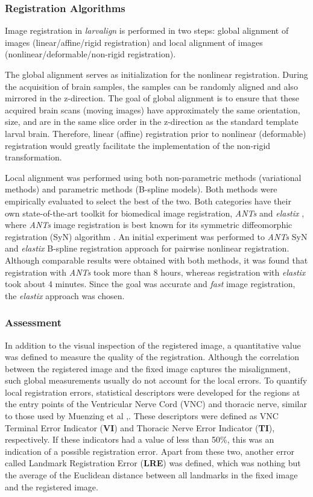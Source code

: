 \documentclass{report}
\begin{document}
	\subsubsection{Registration Algorithms}
	\label{subsubsection:registration_algo}
	Image registration in \emph{{larvalign}} is performed in two steps: global alignment of images (linear/affine/rigid registration) and local alignment of images (nonlinear/deformable/non-rigid registration).
	
	The global alignment serves as initialization for the nonlinear registration. During the acquisition of brain samples, the samples can be randomly aligned and also mirrored in the z-direction. The goal of global alignment is to ensure that these acquired brain scans (moving images) have approximately the same orientation, size, and are in the same slice order in the z-direction as the standard template larval brain.  Therefore, linear (affine) registration prior to nonlinear (deformable) registration would greatly facilitate the implementation of the non-rigid transformation.
	
	Local alignment was performed using both non-parametric methods (variational methods) and parametric methods (B-spline models). Both methods were empirically evaluated to select the best of the two. Both categories have their own state-of-the-art toolkit for biomedical image registration, \emph{ANTs} \cite{Avants2011ARE} and \emph{elastix} \cite{5338015}, where \emph{ANTs} image registration is best known for its symmetric diffeomorphic registration (SyN) algorithm \cite{Avants2008SymmetricDI}. An initial experiment was performed to \emph{ANTs} SyN and \emph{elastix} B-spline registration approach for pairwise nonlinear registration. Although comparable results were obtained with both methods, it was found that registration with \emph{ANTs} took more than 8 hours, whereas registration with \emph{elastix} took about 4 minutes. Since the goal was accurate and \emph{fast} image registration, the \emph{elastix} approach was chosen.
	
	\subsubsection{Assessment}
	\label{subsubsection:assessment}
	In addition to the visual inspection of the registered image, a quantitative value was defined to measure the quality of the registration. Although the correlation between the registered image and the fixed image captures the misalignment, such global measurements usually do not account for the local errors. To quantify local registration errors, statistical descriptors were developed for the regions at the entry points of the Ventricular Nerve Cord (VNC) and thoracic nerve, similar to those used by Muenzing et al \cite{Muenzing},. These descriptors were defined as VNC Terminal Error Indicator (\textbf{VI}) and Thoracic Nerve Error Indicator (\textbf{TI}), respectively. If these indicators had a value of less than 50\%, this was an indication of a possible registration error. Apart from these two, another error called Landmark Registration Error (\textbf{LRE}) was defined, which was nothing but the average of the Euclidean distance between all landmarks in the fixed image and the registered image.
	
\end{document}
